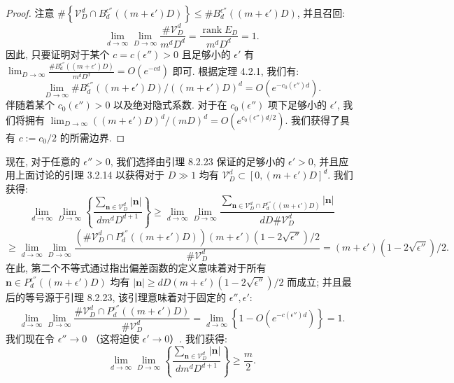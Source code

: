 \begin{proof}
注意 \(\#\left\{\mathcal{V}_{D}^{d}\cap B_{d}^{\epsilon''}\left((m+\epsilon')D\right)\right\} \leq \#B_{d}^{\epsilon''}\left((m+\epsilon')D\right)\), 
并且召回:
\[ \lim_{d \to \infty} \lim_{D \to \infty} \frac{\# \mathcal{V}_D^d}{m^d D^d} = \frac{\operatorname{rank} E_D}{m^d D^d} = 1. \]
因此, 只要证明对于某个 \(c=c(\epsilon'')>0\) 且足够小的 \(\epsilon'\) 有 \(\lim_{D\to\infty} \frac{\#B_d^{\epsilon''}((m+\epsilon')D)}{m^dD^d} = O(e^{-cd})\) 即可. 
根据定理 4.2.1, 我们有:
\[ \lim_{D \to \infty} \#B_d^{\epsilon''}((m+\epsilon')D)/((m+\epsilon')D)^d = O(e^{-c_0(\epsilon'')d}). \]
伴随着某个 \(c_0(\epsilon'') > 0\) 以及绝对隐式系数. 
对于在 \(c_0(\epsilon'')\) 项下足够小的 \(\epsilon'\), 我们将拥有 \(\lim_{D\to\infty}((m+\epsilon')D)^d/(mD)^d = O(e^{c_0(\epsilon'')d/2})\). 
我们获得了具有 \(c:=c_0/2\) 的所需边界.
\end{proof}

现在, 对于任意的 \(\epsilon'' > 0\), 我们选择由引理 8.2.23 保证的足够小的 \(\epsilon' > 0\), 
并且应用上面讨论的引理 3.2.14 以获得对于 \(D \gg 1\) 均有 \(\mathcal{V}_D^d \subset [0, (m+\epsilon')D]^d\). 
我们获得:
\[ \lim_{d \to \infty} \lim_{D \to \infty} \left\{ \frac{\sum_{\mathbf{n} \in \mathcal{V}_D^d} |\mathbf{n}|}{dm^d D^{d+1}} \right\} \ge \lim_{d \to \infty} \lim_{D \to \infty} \frac{\sum_{\mathbf{n} \in \mathcal{V}_D^d \cap P_d^{\epsilon''}((m+\epsilon')D)} |\mathbf{n}|}{dD \# \mathcal{V}_D^d} \]
\[ \ge \lim_{d \to \infty} \lim_{D \to \infty} \frac{(\# \mathcal{V}_D^d \cap P_d^{\epsilon''}((m+\epsilon')D))(m+\epsilon')(1 - 2\sqrt{\epsilon''})/2}{\# \mathcal{V}_D^d} = (m+\epsilon')(1 - 2\sqrt{\epsilon''})/2. \]
在此, 第二个不等式通过指出偏差函数的定义意味着对于所有 \(\mathbf{n} \in P_d^{\epsilon''}((m+\epsilon')D)\) 
均有 \(|\mathbf{n}| \geq dD(m+\epsilon')(1-2\sqrt{\epsilon''})/2\) 
而成立; 
并且最后的等号源于引理 8.2.23, 该引理意味着对于固定的 \(\epsilon'', \epsilon'\):
\[ \lim_{d\to\infty}\lim_{D\to\infty}\frac{\#\mathcal{V}_D^d\cap P_d^{\epsilon''}\left((m+\epsilon')D\right)}{\#\mathcal{V}_D^d}=\lim_{d\to\infty}\left\{1-O(e^{-c(\epsilon'')d})\right\} = 1. \]
我们现在令 \(\epsilon'' \to 0\) （这将迫使 \(\epsilon' \to 0\)）. 我们获得:
\begin{equation}\label{eq:8.2.24}
\lim_{d \to \infty} \lim_{D \to \infty} \left\{ \frac{\sum_{\mathbf{n} \in \mathcal{V}_D^d} |\mathbf{n}|}{dm^d D^{d+1}} \right\} \ge \frac{m}{2}.
\end{equation}

